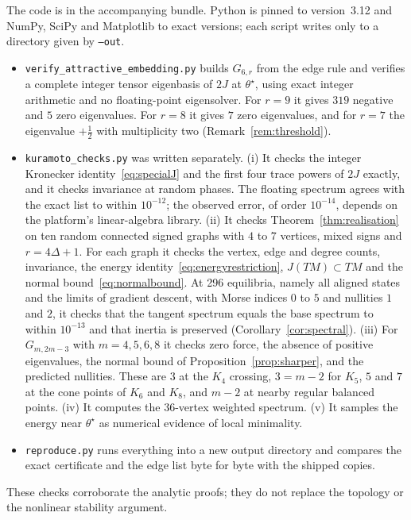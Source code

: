 \documentclass[11pt,a4paper]{article}
\theoremstyle{definition}\newtheorem{conjecture}{Conjecture}
\theoremstyle{remark}\newtheorem{remark}[theorem]{Remark}
\begin{document}
The code is in the accompanying bundle. Python is pinned to version~3.12 and NumPy, SciPy and Matplotlib to exact versions; each script writes only to a directory given by \texttt{--out}.
\begin{itemize}
\item \texttt{verify\_attractive\_embedding.py} builds $G_{6,r}$ from the edge rule and verifies a complete integer tensor eigenbasis of $2J$ at $\theta^\star$, using exact integer arithmetic and no floating-point eigensolver. For $r=9$ it gives $319$ negative and $5$ zero eigenvalues. For $r=8$ it gives $7$ zero eigenvalues, and for $r=7$ the eigenvalue $+\tfrac12$ with multiplicity two (Remark~\ref{rem:threshold}).
\item \texttt{kuramoto\_checks.py} was written separately. (i) It checks the integer Kronecker identity~\eqref{eq:specialJ} and the first four trace powers of $2J$ exactly, and it checks invariance at random phases. The floating spectrum agrees with the exact list to within $10^{-12}$; the observed error, of order $10^{-14}$, depends on the platform's linear-algebra library. (ii) It checks Theorem~\ref{thm:realisation} on ten random connected signed graphs with $4$ to $7$ vertices, mixed signs and $r=4\Delta+1$. For each graph it checks the vertex, edge and degree counts, invariance, the energy identity~\eqref{eq:energyrestriction}, $J(TM)\subset TM$ and the normal bound~\eqref{eq:normalbound}. At 296 equilibria, namely all aligned states and the limits of gradient descent, with Morse indices $0$ to $5$ and nullities $1$ and $2$, it checks that the tangent spectrum equals the base spectrum to within $10^{-13}$ and that inertia is preserved (Corollary~\ref{cor:spectral}). (iii) For $G_{m,2m-3}$ with $m=4,5,6,8$ it checks zero force, the absence of positive eigenvalues, the normal bound of Proposition~\ref{prop:sharper}, and the predicted nullities. These are $3$ at the $K_4$ crossing, $3=m-2$ for $K_5$, $5$ and $7$ at the cone points of $K_6$ and $K_8$, and $m-2$ at nearby regular balanced points. (iv) It computes the 36-vertex weighted spectrum. (v) It samples the energy near $\theta^\star$ as numerical evidence of local minimality.
\item \texttt{reproduce.py} runs everything into a new output directory and compares the exact certificate and the edge list byte for byte with the shipped copies.
\end{itemize}
These checks corroborate the analytic proofs; they do not replace the topology or the nonlinear stability argument.
\end{document}
